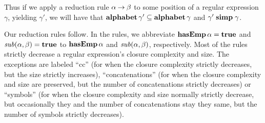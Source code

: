 Thus if we apply a reduction rule $\alpha\mathbin{\to}\beta$ to some position
of a regular expression $\gamma$, yielding $\gamma'$, we will have
that $\mathbf{alphabet}\,\gamma'\subseteq\mathbf{alphabet}\,\gamma$ and $\gamma'\mathrel{\mathbf{simp}}\gamma$.

Our reduction rules follow.  In the rules, we abbreviate
$\mathbf{hasEmp}\,\alpha=\mathbf{true}$ and ${\it sub}(\alpha,\beta)=\mathbf{true}$ to
$\mathbf{hasEmp}\,\alpha$ and ${\it sub}(\alpha,\beta)$, respectively.  Most of
the rules strictly decrease a regular expression's closure complexity
and size.  The exceptions are labeled ``cc'' (for when the closure
complexity strictly decreases, but the size strictly increases),
``concatenations'' (for when the closure complexity and size are
preserved, but the number of concatenations strictly decreases) or
``symbols'' (for when the closure complexity and size normally strictly
decrease, but occasionally they and the number of concatenations stay
they same, but the number of symbols strictly decreases).

